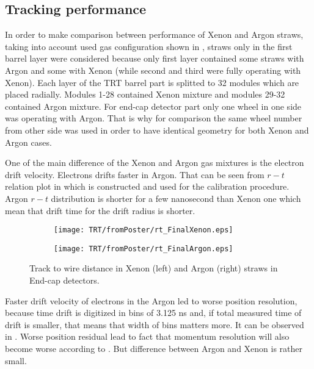 \subsection{Tracking performance}
\label{subsec:TRT:trackPerf}

In order to make comparison between performance of Xenon and Argon straws, taking into account used gas configuration shown in ,
straws only in the first barrel layer were considered because only first layer contained some straws with Argon and some with Xenon 
(while second and third were fully operating with Xenon).
Each layer of the TRT barrel part is splitted to 32 modules which are placed radially. 
Modules 1-28 contained Xenon mixture and modules 29-32 contained Argon mixture.
For end-cap detector part only one wheel in one side was operating with Argon. That is why for comparison the same wheel number from other side was used in order
to have identical geometry for both Xenon and Argon cases.

One of the main difference of the Xenon and Argon gas mixtures is the electron drift velocity. Electrons drifts faster in Argon. 
That can be seen from $r-t$ relation plot in  which is constructed and used for the calibration procedure.
Argon $r-t$ distribution is shorter for a few nanosecond than Xenon one which mean that drift time for the drift radius is shorter.

\begin{figure}
\begin{subfigure}{.5\textwidth}
  \centering
  \texttt{[image: TRT/fromPoster/rt\_FinalXenon.eps]}
\end{subfigure}%
\begin{subfigure}{.5\textwidth}
  \centering
  \texttt{[image: TRT/fromPoster/rt\_FinalArgon.eps]}
\end{subfigure}

\caption{Track to wire distance in Xenon (left) and Argon (right) straws in End-cap detectors.}
  \label{fig:RT_xenon_argon}
\end{figure}

Faster drift velocity of electrons in the Argon led to worse position resolution,
because time drift is digitized in bins of 3.125 ns and, if total measured time of drift is smaller, that means that width of bins matters more.
It can be observed in . Worse position residual lead to fact that momentum resolution will also become worse according to
. But difference between Argon and Xenon is rather small.

